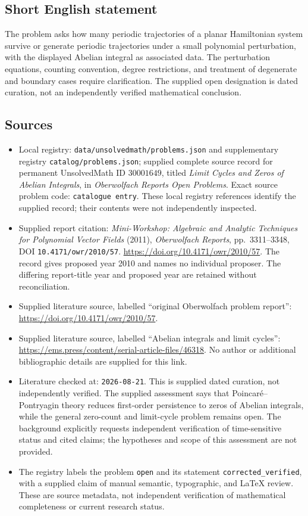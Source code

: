 \documentclass[11pt]{article}
\begin{document}
\subsection{Short English statement}
The problem asks how many periodic trajectories of a planar Hamiltonian system survive or generate periodic trajectories under a small polynomial perturbation, with the displayed Abelian integral as associated data. The perturbation equations, counting convention, degree restrictions, and treatment of degenerate and boundary cases require clarification. The supplied open designation is dated curation, not an independently verified mathematical conclusion.
\subsection{Sources}
\begin{itemize}
\item Local registry: \texttt{data/unsolvedmath/problems.json} and supplementary registry \texttt{catalog/problems.json}; supplied complete source record for permanent UnsolvedMath ID \(30001649\), titled \emph{Limit Cycles and Zeros of Abelian Integrals}, in \emph{Oberwolfach Reports Open Problems}. Exact source problem code: \texttt{catalogue entry}. These local registry references identify the supplied record; their contents were not independently inspected.
\item Supplied report citation: \emph{Mini-Workshop: Algebraic and Analytic Techniques for Polynomial Vector Fields} (2011), \emph{Oberwolfach Reports}, pp.\ 3311--3348, DOI \texttt{10.4171/owr/2010/57}. \url{https://doi.org/10.4171/owr/2010/57}. The record gives proposed year 2010 and names no individual proposer. The differing report-title year and proposed year are retained without reconciliation.
\item Supplied literature source, labelled ``original Oberwolfach problem report'': \url{https://doi.org/10.4171/owr/2010/57}.
\item Supplied literature source, labelled ``Abelian integrals and limit cycles'': \url{https://ems.press/content/serial-article-files/46318}. No author or additional bibliographic details are supplied for this link.
\item Literature checked at: \texttt{2026-08-21}. This is supplied dated curation, not independently verified. The supplied assessment says that Poincar\'e--Pontryagin theory reduces first-order persistence to zeros of Abelian integrals, while the general zero-count and limit-cycle problem remains open. The background explicitly requests independent verification of time-sensitive status and cited claims; the hypotheses and scope of this assessment are not provided.
\item The registry labels the problem \texttt{open} and its statement \texttt{corrected\_verified}, with a supplied claim of manual semantic, typographic, and LaTeX review. These are source metadata, not independent verification of mathematical completeness or current research status.
\end{itemize}
\end{document}
